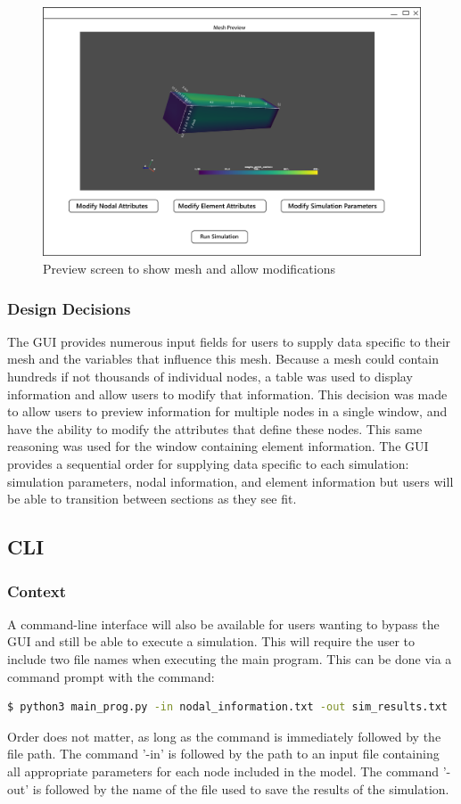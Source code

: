 \documentclass[onecolumn, draftclsnofoot,10pt, compsoc]{IEEEtran}
\begin{document}
\begin{figure}[H]
\centering
\includegraphics[scale=0.5]{GS_preview.png}
\caption{Preview screen to show mesh and allow modifications}
\label{fig:Mesh Preview Screen}
\end{figure}

\subsubsection{Design Decisions}
The GUI provides numerous input fields for users to supply data specific to their mesh and the variables that influence this mesh. Because a mesh could contain hundreds if not thousands of individual nodes, a table was used to display information and allow users to modify that information. This decision was made to allow users to preview information for multiple nodes in a single window, and have the ability to modify the attributes that define these nodes. This same reasoning was used for the window containing element information. The GUI provides a sequential order for supplying data specific to each simulation: simulation parameters, nodal information, and element information but users will be able to transition between sections as they see fit.

\subsection{CLI}
\subsubsection{Context}
A command-line interface will also be available for users wanting to bypass the GUI and still be able to execute a simulation. This will require the user to include two file names when executing the main program. This can be done via a command prompt with the command:
\begin{lstlisting}[language=bash]
  $ python3 main_prog.py -in nodal_information.txt -out sim_results.txt
\end{lstlisting}

Order does not matter, as long as the command is immediately followed by the file path. The command '-in' is followed by the path to an input file containing all appropriate parameters for each node included in the model. The command '-out' is followed by the name of the file used to save the results of the simulation.
\end{document}
